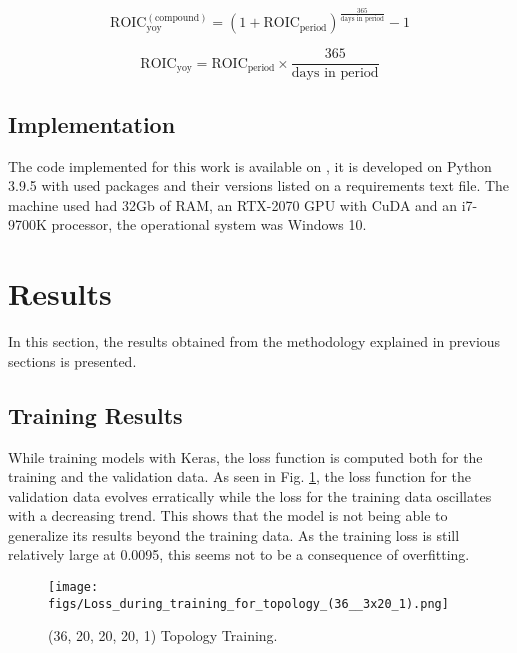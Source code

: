 \documentclass[conference]{IEEEtran}
\begin{document}
\begin{equation}\label{eq:roic_year_comp}
\text{ROIC}_{\text{yoy}}^{(\text{compound})} = \left( 1+ \text{ROIC}_{\text{period}} \right)^{\frac{365}{\text{days in period}}} - 1
\end{equation}

\begin{equation}\label{eq:roic_year}
	\text{ROIC}_{\text{yoy}} = \text{ROIC}_{\text{period}} \times {\frac{365}{\text{days in period}}}
\end{equation}

\subsection{Implementation}

The code implemented for this work is available on \cite{KOJAGITHUBCAP375}, it is developed on Python 3.9.5 with used packages and their versions listed on a requirements text file. The machine used had 32Gb of RAM, an RTX-2070 GPU with CuDA and an i7-9700K processor, the operational system was Windows 10.

\section{Results}

In this section, the results obtained from the methodology explained in previous sections is presented.

\subsection{Training Results}

While training models with Keras, the loss function is computed both for the training and the validation data. As seen in Fig. \ref{fig:3x20_training}, the loss function for the validation data evolves erratically while the loss for the training data oscillates with a decreasing trend. This shows that the model is not being able to generalize its results beyond the training data. As the training loss is still relatively large at 0.0095, this seems not to be a consequence of overfitting.

\begin{figure}[htbp]
    \centerline{\texttt{[image: figs/Loss\_during\_training\_for\_topology\_(36\_\_3x20\_1).png]}}
    \caption{(36, 20, 20, 20, 1) Topology Training.}
    \label{fig:3x20_training}
\end{figure}
\end{document}
